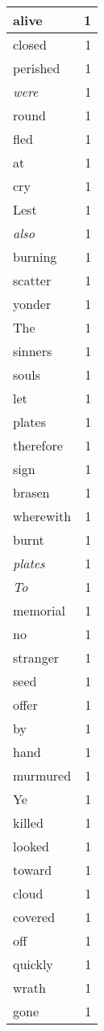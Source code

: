 \begin{center}
\begin{longtable}{l|r}
alive & 1 \\ \hline
closed & 1 \\ \hline
perished & 1 \\ \hline
\emph{were} & 1 \\ \hline
round & 1 \\ \hline
fled & 1 \\ \hline
at & 1 \\ \hline
cry & 1 \\ \hline
Lest & 1 \\ \hline
\emph{also} & 1 \\ \hline
burning & 1 \\ \hline
scatter & 1 \\ \hline
yonder & 1 \\ \hline
The & 1 \\ \hline
sinners & 1 \\ \hline
souls & 1 \\ \hline
let & 1 \\ \hline
plates & 1 \\ \hline
therefore & 1 \\ \hline
sign & 1 \\ \hline
brasen & 1 \\ \hline
wherewith & 1 \\ \hline
burnt & 1 \\ \hline
\emph{plates} & 1 \\ \hline
\emph{To} & 1 \\ \hline
memorial & 1 \\ \hline
no & 1 \\ \hline
stranger & 1 \\ \hline
seed & 1 \\ \hline
offer & 1 \\ \hline
by & 1 \\ \hline
hand & 1 \\ \hline
murmured & 1 \\ \hline
Ye & 1 \\ \hline
killed & 1 \\ \hline
looked & 1 \\ \hline
toward & 1 \\ \hline
cloud & 1 \\ \hline
covered & 1 \\ \hline
off & 1 \\ \hline
quickly & 1 \\ \hline
wrath & 1 \\ \hline
gone & 1 \\ \hline

\end{longtable}
\end{center}
